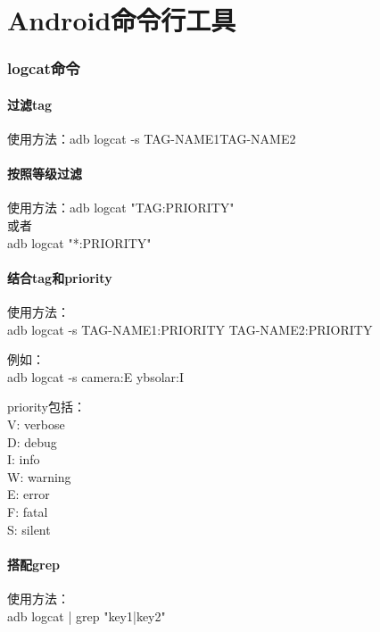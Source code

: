 ﻿\documentclass[a4paper,11pt]{article}
\begin{document}
  \tt %

  \pagestyle{header}
  \sybmaketitle
  \tableofcontents
  \newpage

  \pagestyle{main}
  \setcounter{page}{1}

  \part[Commands for Android]{Android命令行工具}
  \section[logcat - Log dumper for Android] {logcat命令}
  \subsection[filter tag name]{过滤tag}
  使用方法：adb logcat -s \lt TAG-NAME1\gt \lt TAG-NAME2\gt

  \subsection[filter by priority]{按照等级过滤}
  使用方法：adb logcat "TAG:PRIORITY"\\
  或者\\
  adb logcat "*:PRIORITY"

  \subsection[filter by tag and priority]{结合tag和priority}
  使用方法：\\
  adb logcat -s TAG-NAME1:PRIORITY TAG-NAME2:PRIORITY

  例如：\\
  adb logcat -s camera:E ybsolar:I

  priority包括：\\
  V: verbose\\
  D: debug\\
  I: info\\
  W: warning\\
  E: error\\
  F: fatal\\
  S: silent

  \subsection[use grep]{搭配grep}
  使用方法：\\
  adb logcat | grep "key1\bs|key2"
\end{document}
